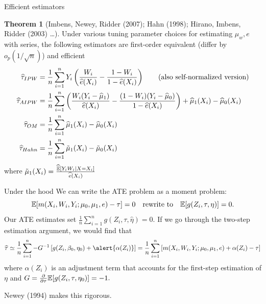 \documentclass[10pt,aspectratio=169,handout]{beamer}
\theoremstyle{definition}
\newtheorem{thm}{Theorem}
\begin{document}
\begin{frame}{Efficient estimators}
  \begin{thm}[Imbens, Newey, Ridder (2007); Hahn (1998); Hirano, Imbens,
  Ridder (2003) \ldots]
    Under various tuning parameter choices for estimating $\mu_w, e$ with
    series, the following estimators are first-order equivalent (differ by
    $o_p(1/\sqrt{n})$) and efficient
    \begin{align*}
    \widehat\tau_{IPW} &= \frac{1}{n} \sum_{i=1}^n Y_i \left({\frac{W_i}{\widehat e
    (X_i)} - \frac{1-W_i}{1-\widehat e(X_i)}}\right) \tag{also self-normalized
    version}\\ 
    \widehat\tau_{AIPW} &= \frac{1}{n}\sum_{i=1}^n \left({\frac{W_i
    (Y_i-\widehat \mu_1)}{\widehat e
    (X_i)} - \frac{(1-W_i)(Y_i-\widehat \mu_0)}{1-\widehat e(X_i)}}\right) + \widehat\mu_1(X_i) - \widehat\mu_0
    (X_i) \\
    \widehat\tau_{OM} &= \frac{1}{n} \sum_{i=1}^n \widehat\mu_1(X_i) - \widehat\mu_0
    (X_i) \\ \widehat\tau_{Hahn} &= \frac{1}{n} \sum_{i=1}^n \tilde\mu_1(X_i) - \tilde\mu_0
    (X_i)
    \end{align*}
    where $\tilde \mu_1(X_i) = \frac{\widehat{\mathbb{E}}[Y_iW_i|X=X_i]}{\widehat e(X_i)}$
    
  \end{thm}
  
\end{frame}

\begin{frame}{Under the hood}
We can write the ATE problem as a moment problem: \[\mathbb{E}[m(X_i,W_i,Y_i;
\mu_0,\mu_1,e) - \tau] = 0 \quad\text{rewrite to}\quad \mathbb{E}[g(Z_i, \tau, \eta
)] = 0.\]
Our ATE estimates set $\frac{1}{n}\sum_{i=1}^n g(Z_i, \tau, \hat\eta) = 0$.
If we go through the \alert{two-step estimation} argument, we would find
that \[
\hat \tau \simeq \frac{1}{n}\sum_{i=1}^n -G^{-1}\bk{g(Z_i,\beta_0,\eta_0) +
\alert{
\alpha(Z_i)}} = \frac{1}{n}\sum_{i=1}^n \bk{m(X_i,W_i,Y_i;
\mu_0,\mu_1,e) + \alpha(Z_i) - \tau}
\]
where $\alpha(Z_i)$ is an adjustment term that accounts for the first-step
estimation of $\eta$ and $G = \frac{\partial{}}{\partial{\tau}}\mathbb{E}[g(Z_i, \tau, \eta_0)] = -1.$

Newey (1994) makes this rigorous.
\end{frame}
\end{document}
